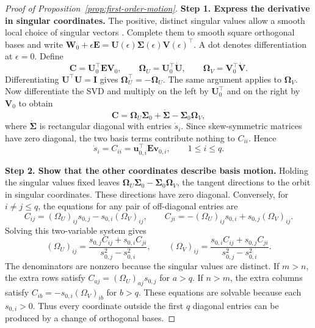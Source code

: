 \begin{proof}[Proof of Proposition~\ref{prop:first-order-motion}]
\textbf{Step 1. Express the derivative in singular coordinates.} The positive, distinct singular values allow a smooth local choice of singular vectors \citep{stewart1990}. Complete them to smooth square orthogonal bases and write $\bm W_0+\epsilon\bm E=\bm U(\epsilon)\bm\Sigma(\epsilon)\bm V(\epsilon)^{\!\top}$. A dot denotes differentiation at $\epsilon=0$. Define
\begin{equation*}
\bm C=\bm U_0^{\!\top}\bm E\bm V_0,\qquad
\bm\Omega_U=\bm U_0^{\!\top}\dot{\bm U},\qquad
\bm\Omega_V=\bm V_0^{\!\top}\dot{\bm V}.
\end{equation*}
Differentiating $\bm U^{\!\top}\bm U=\bm I$ gives $\bm\Omega_U^{\!\top}=-\bm\Omega_U$. The same argument applies to $\bm\Omega_V$. Now differentiate the SVD and multiply on the left by $\bm U_0^{\!\top}$ and on the right by $\bm V_0$ to obtain
\begin{equation*}
\bm C=\bm\Omega_U\bm\Sigma_0+\dot{\bm\Sigma}-\bm\Sigma_0\bm\Omega_V,
\end{equation*}
where $\dot{\bm\Sigma}$ is rectangular diagonal with entries $\dot s_i$. Since skew-symmetric matrices have zero diagonal, the two basis terms contribute nothing to $C_{ii}$. Hence
\begin{equation*}
\dot s_i=C_{ii}=\bm u_{0,i}^{\!\top}\bm E\bm v_{0,i},\qquad 1\leq i\leq q.
\end{equation*}

\textbf{Step 2. Show that the other coordinates describe basis motion.} Holding the singular values fixed leaves $\bm\Omega_U\bm\Sigma_0-\bm\Sigma_0\bm\Omega_V$, the tangent directions to the orbit in singular coordinates. These directions have zero diagonal. Conversely, for $i\neq j\leq q$, the equations for any pair of off-diagonal entries are
\begin{equation*}
C_{ij}=(\Omega_U)_{ij}s_{0,j}-s_{0,i}(\Omega_V)_{ij},\qquad
C_{ji}=-(\Omega_U)_{ij}s_{0,i}+s_{0,j}(\Omega_V)_{ij}.
\end{equation*}
Solving this two-variable system gives
\begin{equation*}
(\Omega_U)_{ij}=\frac{s_{0,j}C_{ij}+s_{0,i}C_{ji}}{s_{0,j}^2-s_{0,i}^2},\qquad
(\Omega_V)_{ij}=\frac{s_{0,i}C_{ij}+s_{0,j}C_{ji}}{s_{0,j}^2-s_{0,i}^2}.
\end{equation*}
The denominators are nonzero because the singular values are distinct. If $m>n$, the extra rows satisfy $C_{aj}=(\Omega_U)_{aj}s_{0,j}$ for $a>q$. If $n>m$, the extra columns satisfy $C_{ib}=-s_{0,i}(\Omega_V)_{ib}$ for $b>q$. These equations are solvable because each $s_{0,i}>0$. Thus every coordinate outside the first $q$ diagonal entries can be produced by a change of orthogonal bases.


\end{proof}

